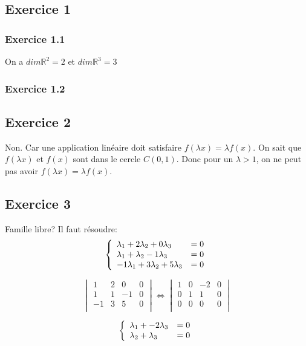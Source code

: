 \documentclass[]{book}
\theoremstyle{definition}
\newcommand{\bb}[1]{\mathbb{#1}}
\newcommand{\R}{\bb{R}}
\begin{document}
\subsection*{Exercice 1}
\subsubsection*{Exercice 1.1}
On a $dim \R^2 = 2$ et $dim \R^3 = 3$


\subsubsection*{Exercice 1.2}


\subsection*{Exercice 2}
Non. Car une application lin\'eaire doit satisfaire $f(\lambda x) = \lambda f(x)$. On sait que $f(\lambda x)$ et $f(x)$ sont dans le cercle $C(0,1)$. Donc pour un $\lambda > 1$, on ne peut pas avoir $f(\lambda x) = \lambda f(x)$. 



\subsection*{Exercice 3}
Famille libre? Il faut r\'esoudre:
$$
\left\{ 
\begin{array}{l l}
\lambda_{1} + 2\lambda_{2} + 0\lambda_{3} & = 0\\
\lambda_{1} + \lambda_{2} - 1\lambda_{3} & = 0\\
-1\lambda_{1} + 3\lambda_{2} + 5\lambda_{3} & = 0\\
\end{array}
\right. 
$$ 


$$
\begin{vmatrix}
1 & 2  & 0 & 0 \\
1 & 1  & -1 & 0 \\
-1 & 3 & 5 & 0 \\
\end{vmatrix}
\Leftrightarrow
\begin{vmatrix}
1 & 0 & -2 & 0 \\
0 & 1 & 1 & 0  \\
0 & 0 & 0 & 0  \\
\end{vmatrix}
$$

$$
\left\{ 
\begin{array}{l l}
\lambda_{1} + -2\lambda_{3} & = 0\\
\lambda_{2} + \lambda_{3} & = 0\\
\end{array}
\right. 
$$ 
\end{document}
